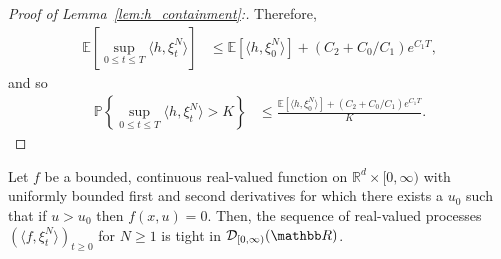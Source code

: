 \documentclass[EJP]{ejpecp} %
\newcommand{\IP}{\mathbb P}
\newcommand{\IE}{\mathbb E}
\newcommand{\IR}{\mathbb R}
\newcommand{\lp}{\xi}              %
\begin{document}
\begin{proof}[Proof of Lemma~\ref{lem:h_containment}:]
    Therefore, 
    \begin{align*}
        \IE\left[ \sup_{0 \le t \le T} \langle h, \lp_t^N \rangle \right]
        &\le
        \IE\left[ \langle h, \lp_0^N \rangle \right]
        + (C_2 + C_0 / C_1) e^{C_1 T},
    \end{align*}
    and so
    \begin{align*}
        \IP\left\{ \sup_{0 \le t \le T} \langle h, \lp_t^N \rangle > K \right\}
        &\le
        \frac{
            \IE\left[ \langle h, \lp_0^N \rangle \right]
            + (C_2 + C_0 / C_1) e^{C_1 T}
        }{ K } .
    \end{align*}
\end{proof}

\begin{lemma}
    \label{lem:test_fn_tightness}
    Let $f$ be a bounded, continuous real-valued function on $\IR^d \times [0, \infty)$
    with uniformly bounded first and second derivatives
    for which there exists a $u_0$ such that if $u > u_0$ then $f(x, u) = 0$.
    Then, the sequence of real-valued processes $(\langle f, \lp_t^N \rangle)_{t \ge 0}$ for $N \ge 1$
    is tight in ${\cal D}_{[0,\infty)}(\IR)$.
\end{lemma}
\end{document}
